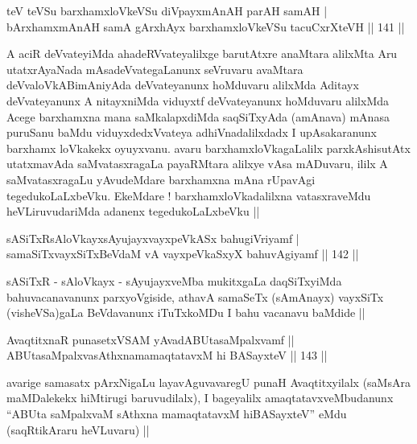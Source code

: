 \begin{shl}
teV teVSu barxhamxloVkeVSu diVpayxmAnAH parAH samAH | \\
bArxhamxmAnAH samA gArxhAyx barxhamxloVkeVSu tacuCxrXteVH \hfill|| 141 || 
\end{shl}

\begin{artha}
A aciR deVvateyiMda ahadeRVvateyalilxge barutAtxre anaMtara alilxMta
Aru utatxrAyaNada mAsadeVvategaLanunx seVruvaru avaMtara
deVvaloVkABimAniyAda deVvateyanunx hoMduvaru alilxMda Aditayx
deVvateyanunx A nitayxniMda viduyxtf deVvateyanunx hoMduvaru alilxMda
Acege barxhamxna mana saMkalapxdiMda saqSiTxyAda (amAnava) mAnasa
puruSanu baMdu viduyxdedxVvateya adhiVnadalilxdadx I upAsakaranunx
barxhamx loVkakekx oyuyxvanu. avaru barxhamxloVkagaLalilx
parxkAshisutAtx utatxmavAda saMvatasxragaLa payaRMtara alilxye vAsa
mADuvaru, ililx A saMvatasxragaLu yAvudeMdare  barxhamxna mAna
rUpavAgi tegedukoLaLxbeVku. EkeMdare ! barxhamxloVkadalilxna
vatasxraveMdu heVLiruvudariMda adanenx tegedukoLaLxbeVku || 
\end{artha}


\begin{shl}
sASiTxRsAloVkayxsAyujayxvayxpeVkASx bahugiVriyamf | \\
samaSiTxvayxSiTxBeVdaM vA vayxpeVkaSxyX bahuvAgiyamf \hfill|| 142 || 
\end{shl}

\begin{artha}
sASiTxR - sAloVkayx - sAyujayxveMba mukitxgaLa daqSiTxyiMda
bahuvacanavanunx parxyoVgiside, athavA samaSeTx (sAmAnayx) vayxSiTx
(visheVSa)gaLa BeVdavanunx iTuTxkoMDu I bahu vacanavu baMdide ||
\end{artha}


\begin{shl}
AvaqtitxnaR punasetxVSAM yAvadABUtasaMpalxvamf || \\
ABUtasaMpalxvasAthxnamamaqtatavxM hi BASayxteV \hfill|| 143 || 
\end{shl}

\begin{artha}
avarige samasatx pArxNigaLu layavAguvavaregU punaH Avaqtitxyilalx
(saMsAra maMDalekekx hiMtirugi baruvudilalx), I bageyalilx
amaqtatavxveMbudanunx ``ABUta saMpalxvaM sAthxna mamaqtatavxM
hiBASayxteV'' eMdu (saqRtikAraru heVLuvaru) ||
\end{artha}

